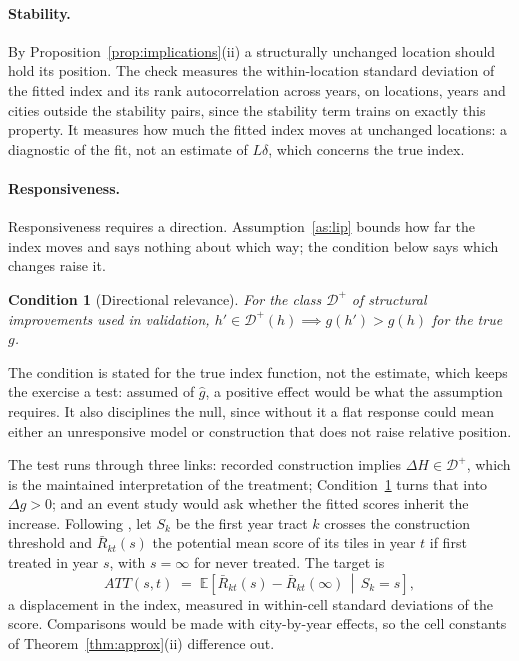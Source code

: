 \documentclass[11pt]{article}
\newtheorem{condition}{Condition}
\theoremstyle{remark}
\newcommand{\E}{\mathbb{E}}
\begin{document}
\paragraph{Stability.} By Proposition~\ref{prop:implications}(ii) a structurally unchanged location
should hold its position. The check measures the within-location standard deviation of the fitted
index and its rank autocorrelation across years, on locations, years and cities outside the stability
pairs, since the stability term trains on exactly this property. It measures how much the fitted index
moves at unchanged locations: a diagnostic of the fit, not an estimate of $L\delta$, which concerns the
true index.

\paragraph{Responsiveness.} Responsiveness requires a direction. Assumption~\ref{as:lip} bounds how far
the index moves and says nothing about which way; the condition below says which changes
raise it.

\begin{condition}[Directional relevance]\label{cond:direct}
For the class $\mathcal{D}^{+}$ of structural improvements used in validation,
$h' \in \mathcal{D}^{+}(h) \implies g(h') > g(h)$ for the true $g$.
\end{condition}

The condition is stated for the true index function, not the estimate, which keeps the exercise a test:
assumed of $\hat{g}$, a positive effect would be what the assumption requires. It also disciplines the
null, since without it a flat response could mean either an unresponsive model or construction that does
not raise relative position.

The test runs through three links: recorded construction implies $\Delta H \in \mathcal{D}^{+}$, which
is the maintained interpretation of the treatment; Condition~\ref{cond:direct} turns that into
$\Delta g > 0$; and an event study would ask whether the fitted scores inherit the increase. Following
\citet{callaway2021difference}, let $S_k$ be the first year tract $k$ crosses the construction threshold
and $\bar{R}_{kt}(s)$ the potential mean score of its tiles in year $t$ if first treated in year
$s$, with $s=\infty$ for never treated. The target is
\[
    ATT(s,t) \;=\; \E\!\left[\bar{R}_{kt}(s) - \bar{R}_{kt}(\infty) \,\middle|\, S_k = s\right],
\]
a displacement in the index, measured in within-cell standard deviations of the score.
Comparisons would be made with city-by-year effects, so the cell constants of
Theorem~\ref{thm:approx}(ii) difference out.
\end{document}
